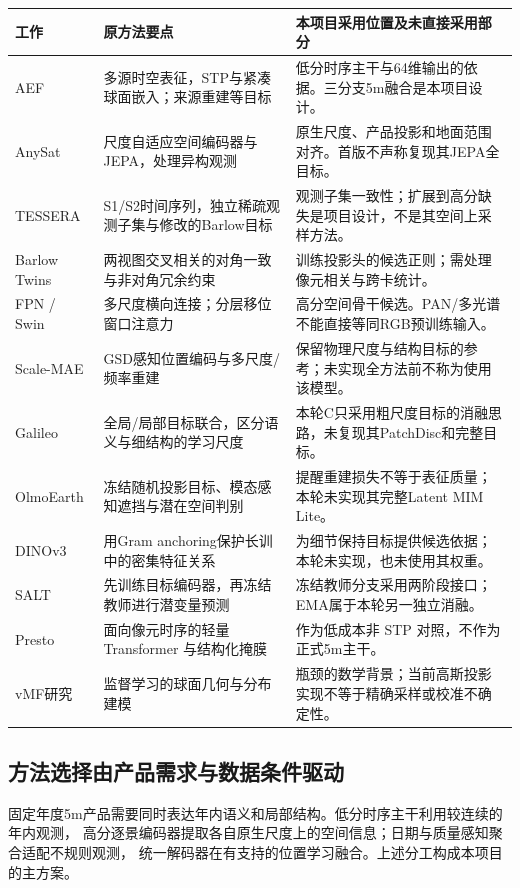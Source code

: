 \documentclass[UTF8,fontset=fandol,zihao=5,a4paper]{ctexart}
\begin{document}
\noindent\begin{tabularx}{\linewidth}{@{}p{2.6cm}YY@{}}
\toprule 工作 & 原方法要点 & 本项目采用位置及未直接采用部分\\\midrule
AEF\cite{aef} & 多源时空表征，STP与紧凑球面嵌入；来源重建等目标 & 低分时序主干与64维输出的依据。三分支5m融合是本项目设计。\\
AnySat\cite{anysat} & 尺度自适应空间编码器与JEPA，处理异构观测 & 原生尺度、产品投影和地面范围对齐。首版不声称复现其JEPA全目标。\\
TESSERA\cite{tessera} & S1/S2时间序列，独立稀疏观测子集与修改的Barlow目标 & 观测子集一致性；扩展到高分缺失是项目设计，不是其空间上采样方法。\\
Barlow Twins\cite{barlow} & 两视图交叉相关的对角一致与非对角冗余约束 & 训练投影头的候选正则；需处理像元相关与跨卡统计。\\
FPN / Swin\cite{fpn,swin} & 多尺度横向连接；分层移位窗口注意力 & 高分空间骨干候选。PAN/多光谱不能直接等同RGB预训练输入。\\
Scale-MAE\cite{scalemae} & GSD感知位置编码与多尺度/频率重建 & 保留物理尺度与结构目标的参考；未实现全方法前不称为使用该模型。\\
Galileo\cite{galileo} & 全局/局部目标联合，区分语义与细结构的学习尺度 & 本轮C只采用粗尺度目标的消融思路，未复现其PatchDisc和完整目标。\\
OlmoEarth\cite{olmoearth} & 冻结随机投影目标、模态感知遮挡与潜在空间判别 & 提醒重建损失不等于表征质量；本轮未实现其完整Latent MIM Lite。\\
DINOv3\cite{dinov3} & 用Gram anchoring保护长训中的密集特征关系 & 为细节保持目标提供候选依据；本轮未实现，也未使用其权重。\\
SALT\cite{salt} & 先训练目标编码器，再冻结教师进行潜变量预测 & 冻结教师分支采用两阶段接口；EMA属于本轮另一独立消融。\\
Presto\cite{presto} & 面向像元时序的轻量 Transformer 与结构化掩膜 & 作为低成本非 STP 对照，不作为正式5m主干。\\
vMF研究\cite{vmf} & 监督学习的球面几何与分布建模 & 瓶颈的数学背景；当前高斯投影实现不等于精确采样或校准不确定性。\\\bottomrule
\end{tabularx}

\subsection{方法选择由产品需求与数据条件驱动}
固定年度5m产品需要同时表达年内语义和局部结构。低分时序主干利用较连续的年内观测，
高分逐景编码器提取各自原生尺度上的空间信息；日期与质量感知聚合适配不规则观测，
统一解码器在有支持的位置学习融合。上述分工构成本项目的主方案。
\end{document}
